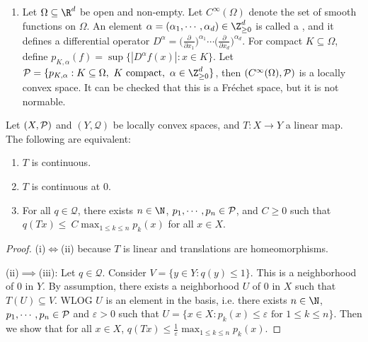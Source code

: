 \documentclass[a4paper]{article}
\begin{document}
{\begin{eg}
\begin{enumerate}[label=(\arabic*)]
		There exists a sequence of compact sets $(K_n)$ in $U$ such that $K_n\subseteq\Int K_{n+1}$ and $\bigcup K_n=U$. Such sequences are called a  of $U$. It can be checked that $\{p_{K_n}:n\in\N\}\sim\P$, so $\Oc(U)$ is metrizable. In fact, it is a , i.e. a complete metrizable locally convex space.

		It is not normable: recall Montel's theorem in complex analysis states that if a sequence $(f_n)$ in $\Oc(U)$ is locally bounded, then $(f_n)$ has a convergent subsequence. If there is a norm, this would imply the unit ball is compact, which is a contradiction since $\Oc(U)$ is infinite-dimensional.
		\item Let $\Omega\subseteq\R^d$ be open and non-empty. Let $C^\infty(\Omega)$ denote the set of smooth functions on $\Omega$. An element $\alpha=(\alpha_1,\cdots,\alpha_d)\in\Z_{\geq 0}^d$ is called a , and it defines a differential operator $D^\alpha=\big(\frac{\partial}{\partial x_1}\big)^{\alpha_1}\cdots\big(\frac{\partial}{\partial x_d}\big)^{\alpha_d}$. For compact $K\subseteq\Omega$, define $p_{K,\alpha}(f)=\sup\{|D^\alpha f(x)|:x\in K\}$. Let $\P=\{p_{K,\alpha}:K\subseteq\Omega,\ K\text{ compact},\ \alpha\in\Z_{\geq 0}^d\}$, then $(C^\infty(\Omega),\P)$ is a locally convex space. It can be checked that this is a Fr\'echet space, but it is not normable.
	\end{enumerate}
\end{eg}

\begin{nlemma}\label{lem:LCSCts}
	Let $(X,\P)$ and $(Y,\mathcal{Q})$ be locally convex spaces, and $T:X\to Y$ a linear map. The following are equivalent:
	\begin{enumerate}[nosep, label=(\roman*)]
		\item $T$ is continuous.
		\item $T$ is continuous at 0.
		\item For all $q\in\mathcal{Q}$, there exists $n\in\N$, $p_1,\cdots,p_n\in\P$, and $C\geq 0$ such that $q(Tx)\leq\ C\max_{1\leq k\leq n}p_k(x)$ for all $x\in X$.
	\end{enumerate}
\end{nlemma}

\begin{proof}
  (i)$\iff$(ii) because $T$ is linear and translations are homeomorphisms.

  (ii)$\implies$(iii): Let $q\in\mathcal{Q}$. Consider $V=\{y\in Y:q(y)\leq 1\}$. This is a neighborhood of 0 in $Y$. By assumption, there exists a neighborhood $U$ of 0 in $X$ such that $T(U)\subseteq V$. WLOG $U$ is an element in the basis, i.e. there exists $n\in\N$, $p_1,\cdots,p_n\in\P$ and $\varepsilon>0$ such that $U=\{x\in X:p_k(x)\leq\varepsilon\text{ for }1\leq k\leq n\}$. Then we show that for all $x\in X$, $q(Tx)\leq\frac{1}{\varepsilon}\max_{1\leq k\leq n}p_k(x)$.


\end{proof}}
\end{document}
